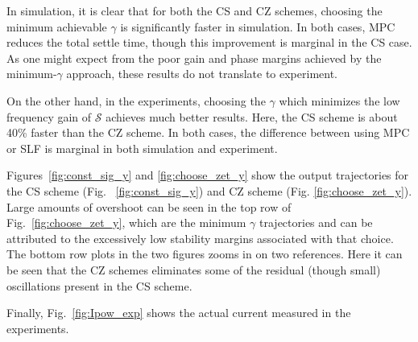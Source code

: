 \documentclass[journal,twocolumn,twoside]{IEEEtran}
\begin{document}
In simulation, it is clear that for both the CS and CZ schemes, choosing the minimum achievable $\gamma$ is significantly faster in simulation. In both cases, MPC reduces the total settle time, though this improvement is marginal in the CS case. As one might expect from the poor gain and phase margins achieved by the minimum-$\gamma$ approach, these results do not translate to experiment.

On the other hand, in the experiments, choosing the $\gamma$ which minimizes the low frequency gain of $\mathcal{S}$ achieves much better results. Here, the CS scheme is about 40\% faster than the CZ scheme. In both cases, the difference between using MPC or SLF is marginal in both simulation and experiment.

Figures~\ref{fig:const_sig_y} and \ref{fig:choose_zet_y} show the output trajectories for the CS scheme (Fig. ~\ref{fig:const_sig_y}) and CZ scheme (Fig. \ref{fig:choose_zet_y}). Large amounts of overshoot can be seen in the top row of Fig.~\ref{fig:choose_zet_y}, which are the minimum $\gamma$ trajectories and can be attributed to the excessively low stability margins associated with that choice. The bottom row plots in the two figures zooms in on two references. Here it can be seen that the CZ schemes eliminates some of the residual (though small) oscillations present in the CS scheme.

Finally, Fig.~\ref{fig:Ipow_exp}  shows the actual current measured in the experiments.

\begin{figure*}
  \begin{minipage}{1\columnwidth}
    
  \caption{(top) All the step inputs. (bottom left) best. (bottom right) worst}
  \label{fig:const_sig_y}
\end{minipage}
\hfill
\begin{minipage}{1\columnwidth}
  
  \caption{(top) All the step inputs. (bottom left) best. (bottom right) worst}
  \label{fig:choose_zet_y}
\end{minipage}
\end{figure*}

\begin{figure*}
  
  
  \caption{(left) Simulated and settling-time vs reference size for the 8 different control schemes. (left) Shows the same set of steps for the experimental results. }
  \label{fig:ts_vs_delr}
\end{figure*}
\end{document}
